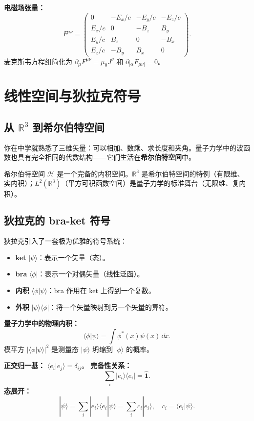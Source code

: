 \textbf{电磁场张量：}
\[
F^{\mu\nu} = \begin{pmatrix}
0 & -E_x/c & -E_y/c & -E_z/c \\
E_x/c & 0 & -B_z & B_y \\
E_y/c & B_z & 0 & -B_x \\
E_z/c & -B_y & B_x & 0
\end{pmatrix}.
\]
麦克斯韦方程组简化为 $\partial_\mu F^{\mu\nu} = \mu_0 J^\nu$ 和 $\partial_{[\alpha}F_{\mu\nu]} = 0$。

\section{线性空间与狄拉克符号}

\subsection{从 \texorpdfstring{$\mathbb{R}^3$}{R³} 到希尔伯特空间}

你在中学就熟悉了三维矢量：可以相加、数乘、求长度和夹角。量子力学中的波函数也具有完全相同的代数结构——它们生活在\textbf{希尔伯特空间}中。

希尔伯特空间 $\mathcal{H}$ 是一个完备的内积空间。$\mathbb{R}^3$ 是希尔伯特空间的特例（有限维、实内积）；$L^2(\mathbb{R}^3)$（平方可积函数空间）是量子力学的标准舞台（无限维、复内积）。

\subsection{狄拉克的 bra-ket 符号}

狄拉克引入了一套极为优雅的符号系统：
\begin{itemize}
  \item \textbf{ket} $|\psi\rangle$：表示一个矢量（态）。
  \item \textbf{bra} $\langle\phi|$：表示一个对偶矢量（线性泛函）。
  \item \textbf{内积} $\langle\phi|\psi\rangle$：bra 作用在 ket 上得到一个复数。
  \item \textbf{外积} $|\psi\rangle\langle\phi|$：将一个矢量映射到另一个矢量的算符。
\end{itemize}

\textbf{量子力学中的物理内积：}
\[
\langle\phi|\psi\rangle = \int \phi^*(x)\psi(x)\,\dd x.
\]
模平方 $|\langle\phi|\psi\rangle|^2$ 是测量态 $|\psi\rangle$ 坍缩到 $|\phi\rangle$ 的概率。

\textbf{正交归一基：} $\langle e_i|e_j\rangle = \delta_{ij}$。
\textbf{完备性关系：}
\[
\sum_i |e_i\rangle\langle e_i| = \hat{\mathbf{1}}.
\]
\textbf{态展开：}
\[
|\psi\rangle = \sum_i |e_i\rangle\langle e_i|\psi\rangle = \sum_i c_i|e_i\rangle,
\quad c_i = \langle e_i|\psi\rangle.
\]

